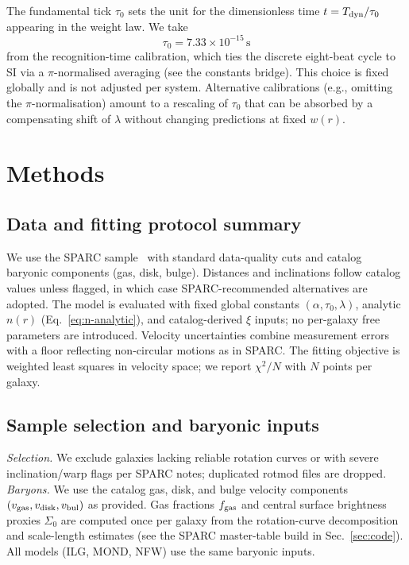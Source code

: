 \documentclass[twocolumn,prd,amsmath,amssymb,aps,superscriptaddress,nofootinbib]{revtex4-2}
\begin{document}
The fundamental tick $\tau_0$ sets the unit for the dimensionless time $t=T_{\rm dyn}/\tau_0$ appearing in the weight law. We take
\[
  \tau_0 = 7.33\times10^{-15}\,\mathrm{s}
\]
from the recognition-time calibration, which ties the discrete eight-beat cycle to SI via a $\pi$-normalised averaging (see the constants bridge). This choice is fixed globally and is not adjusted per system. Alternative calibrations (e.g., omitting the $\pi$-normalisation) amount to a rescaling of $\tau_0$ that can be absorbed by a compensating shift of $\lambda$ without changing predictions at fixed $w(r)$.

\section{Methods}

\subsection{Data and fitting protocol summary}
\label{sec:data-fitting}

We use the SPARC sample~\cite{Lelli2016} with standard data-quality cuts and catalog baryonic components (gas, disk, bulge). Distances and inclinations follow catalog values unless flagged, in which case SPARC-recommended alternatives are adopted. The model is evaluated with fixed global constants $(\alpha,\tau_0,\lambda)$, analytic $n(r)$ (Eq.~\ref{eq:n-analytic}), and catalog-derived $\xi$ inputs; no per-galaxy free parameters are introduced. Velocity uncertainties combine measurement errors with a floor reflecting non-circular motions as in SPARC. The fitting objective is weighted least squares in velocity space; we report $\chi^2/N$ with $N$ points per galaxy.

\subsection{Sample selection and baryonic inputs}
\label{sec:selection-baryons}

\textit{Selection.} We exclude galaxies lacking reliable rotation curves or with severe inclination/warp flags per SPARC notes; duplicated rotmod files are dropped.\newline
\textit{Baryons.} We use the catalog gas, disk, and bulge velocity components $(v_{\rm gas}, v_{\rm disk}, v_{\rm bul})$ as provided. Gas fractions $f_{\rm gas}$ and central surface brightness proxies $\Sigma_0$ are computed once per galaxy from the rotation-curve decomposition and scale-length estimates (see the SPARC master-table build in Sec.~\ref{sec:code}). All models (ILG, MOND, NFW) use the same baryonic inputs.
\end{document}
